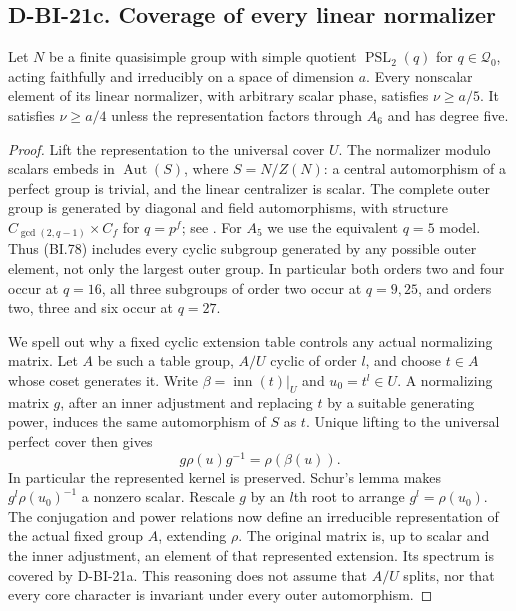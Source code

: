 \subsection*{D-BI-21c. Coverage of every linear normalizer}

\begin{lemma}
\label{D-BI-21c}
Let $N$ be a finite quasisimple group with simple quotient
$\operatorname{PSL}_2(q)$ for $q\in\mathcal Q_0$, acting faithfully
and irreducibly on a space of dimension $a$.  Every nonscalar
element of its linear normalizer, with arbitrary scalar phase,
satisfies $\nu\ge a/5$.  It satisfies $\nu\ge a/4$ unless
the representation factors through $A_6$ and has degree five.
\end{lemma}

\begin{proof}
Lift the representation to the universal cover $U$.  The
normalizer modulo scalars embeds in $\operatorname{Aut}(S)$,
where $S=N/Z(N)$: a central automorphism of a perfect group is
trivial, and the linear centralizer is scalar.  The complete
outer group is generated by diagonal and field automorphisms,
with structure $C_{\gcd(2,q-1)}\times C_f$ for $q=p^f$;
see \cite[\S2, pp.~2--3; \S3, p.~6]{BI:WhiteSL2}.
For $A_5$ we use the equivalent $q=5$ model.  Thus (BI.78)
includes every cyclic subgroup generated by any possible outer
element, not only the largest outer group.  In particular both
orders two and four occur at $q=16$, all three subgroups of order
two occur at $q=9,25$, and orders two, three and six occur at $q=27$.

We spell out why a fixed cyclic extension table controls any
actual normalizing matrix.  Let $A$ be such a table group,
$A/U$ cyclic of order $l$, and choose $t\in A$ whose coset
generates it.  Write $\beta=\operatorname{inn}(t)|_U$ and
$u_0=t^l\in U$.  A normalizing matrix $g$, after an inner
adjustment and replacing $t$ by a suitable generating power,
induces the same automorphism of $S$ as $t$.  Unique lifting to
the universal perfect cover then gives
\[
                  g\rho(u)g^{-1}=\rho(\beta(u)).
\]
In particular the represented kernel is preserved.  Schur's
lemma makes $g^l\rho(u_0)^{-1}$ a nonzero scalar.  Rescale $g$
by an $l$th root to arrange $g^l=\rho(u_0)$.  The conjugation
and power relations now define an irreducible representation
of the actual fixed group $A$, extending $\rho$.  The original
matrix is, up to scalar and the inner adjustment, an element
of that represented extension.  Its spectrum is covered by
D-BI-21a.  This reasoning does not assume that $A/U$ splits,
nor that every core character is invariant under every outer
automorphism.


\end{proof}
